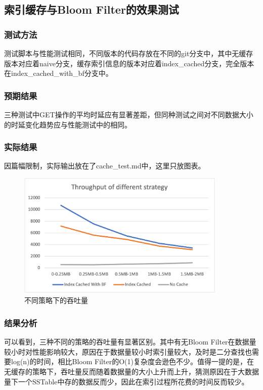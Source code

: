 \documentclass{ctexart}
\begin{document}
\subsection{索引缓存与Bloom Filter的效果测试}

\subsubsection{测试方法}
测试脚本与性能测试相同，不同版本的代码存放在不同的git分支中，其中无缓存版本对应着naive分支，缓存索引信息的版本对应着index\_cached分支，完全版本在index\_cached\_with\_bf分支中。

\subsubsection{预期结果}
三种测试中GET操作的平均时延应有显著差距，但同种测试之间对不同数据大小的时延变化趋势应与性能测试中的相同。

\subsubsection{实际结果}
因篇幅限制，实际输出放在了cache\_test.md中，这里只放图表。
\begin{figure}[h!]
  \centering
  \includegraphics[width=10cm]{Strategy.png}
  \caption{不同策略下的吞吐量}
\end{figure}

\subsubsection{结果分析}
可以看到，三种不同的策略的吞吐量有显著区别。其中有无Bloom Filter在数据量较小时对性能影响较大，原因在于数据量较小时索引量较大，及时是二分查找也需要log(n)的时间，相比Bloom Filter的O(1)复杂度会逊色不少。值得一提的是，在无缓存的策略下，吞吐量反而随着数据量的大小上升而上升，猜测原因在于大数据量下一个SSTable中存的数据反而少，因此在索引过程所花费的时间反而较少。
\end{document}
